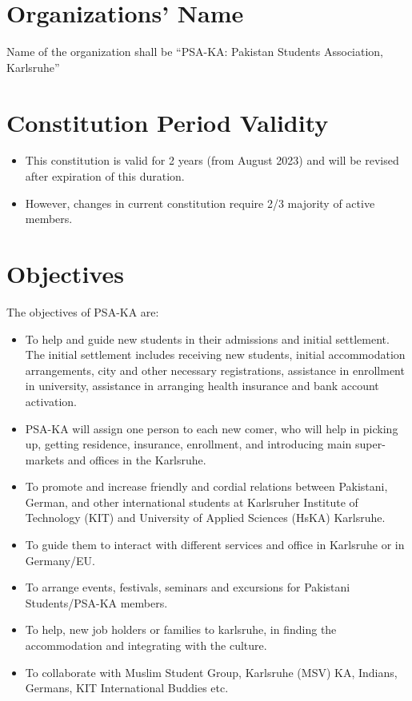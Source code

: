 \section{Organizations’ Name}
Name of the organization shall be “PSA-KA: Pakistan Students Association, Karlsruhe” 
\section{Constitution Period Validity }
\begin{itemize}
	\item This constitution is valid for 2 years (from August 2023) and will be revised after expiration of this duration. 
	\item However, changes in current constitution require 2/3 majority of active members. 
\end{itemize}
\section{Objectives }
The objectives of PSA-KA are: 
\begin{itemize}
	\item To help and guide new students in their admissions and initial settlement. The initial settlement includes receiving new students, initial accommodation arrangements, city and other necessary registrations, assistance in enrollment in university, assistance in arranging health insurance and bank account activation. 
	\item PSA-KA will assign one person to each new comer, who will help in picking up, getting residence, insurance, enrollment, and introducing main super-markets and offices in the Karlsruhe.
	\item To promote and increase friendly and cordial relations between Pakistani, German, and other international students at Karlsruher Institute of Technology (KIT) and University of Applied Sciences (HsKA) Karlsruhe. 
	\item To guide them to interact with different services and office in Karlsruhe or in Germany/EU. 
	\item To arrange events, festivals, seminars and excursions for Pakistani Students/PSA-KA members. 
	\item To help, new job holders or families to karlsruhe, in finding the accommodation and integrating with the culture.
	\item To collaborate with Muslim Student Group, Karlsruhe (MSV) KA, Indians, Germans, KIT International Buddies etc. 
\end{itemize}
